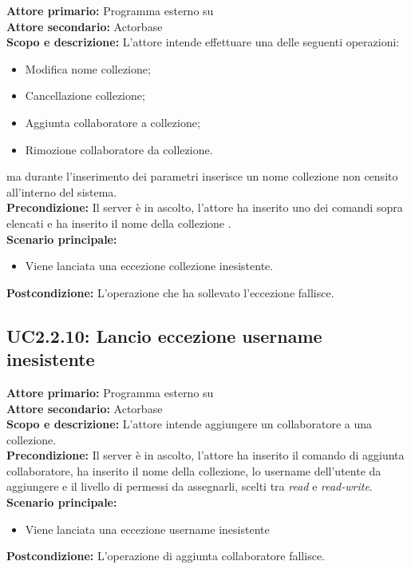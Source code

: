 \documentclass{scalatekids-article}
\begin{document}
\textbf{Attore primario:} Programma esterno su \\
\textbf{Attore secondario:} Actorbase\\
\textbf{Scopo e descrizione:} L'attore intende effettuare una delle seguenti operazioni:
\begin{itemize}
\item Modifica nome collezione;
\item Cancellazione collezione;
\item Aggiunta collaboratore a collezione;
\item Rimozione collaboratore da collezione.
\end{itemize}
ma durante l'inserimento dei parametri inserisce un nome collezione non censito all'interno del sistema.\\
\textbf{Precondizione:} Il server è in ascolto, l'attore ha inserito uno dei comandi sopra elencati e ha inserito il nome della collezione .\\
\textbf{Scenario principale:}
\begin{itemize}
\item Viene lanciata una eccezione collezione inesistente.
\end{itemize}
\textbf{Postcondizione:} L'operazione che ha sollevato l'eccezione fallisce.

\subsection{UC2.2.10: Lancio eccezione username inesistente}

\textbf{Attore primario:} Programma esterno su \\
\textbf{Attore secondario:} Actorbase\\
\textbf{Scopo e descrizione:} L'attore intende aggiungere un collaboratore a una collezione.\\
\textbf{Precondizione:} Il server è in ascolto, l'attore ha inserito il comando di aggiunta collaboratore, ha inserito il nome della collezione, lo username dell'utente da aggiungere e il livello di permessi da assegnarli, scelti tra \textit{read} e \textit{read-write}.\\
\textbf{Scenario principale:}
\begin{itemize}
\item Viene lanciata una eccezione username inesistente
\end{itemize}
\textbf{Postcondizione:} L'operazione di aggiunta collaboratore fallisce.
\end{document}
